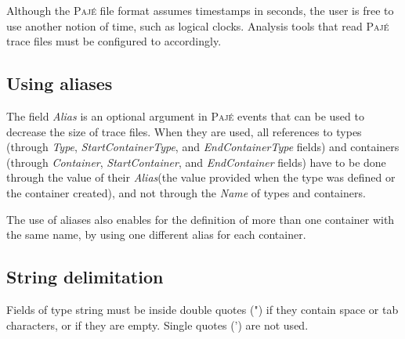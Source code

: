 \documentclass[12pt]{article}
\newcommand{\Paje}{\textsc{Paj\'e}\xspace}
\newcommand{\PajeField}[1]{\emph{#1}\xspace}
\newcommand{\Name}{\PajeField{Name}}
\newcommand{\Type}{\PajeField{Type}}
\newcommand{\Container}{\PajeField{Container}}
\newcommand{\StartContainerType}{\PajeField{StartContainerType}}
\newcommand{\EndContainerType}{\PajeField{EndContainerType}}
\newcommand{\Alias}{\PajeField{Alias}}
\newcommand{\EndContainer}{\PajeField{EndContainer}}
\newcommand{\StartContainer}{\PajeField{StartContainer}}
\begin{document}
Although the \Paje file format assumes timestamps in seconds, the user
is free to use another notion of time, such as logical
clocks. Analysis tools that read \Paje trace files must be configured
to accordingly.


\subsection{Using aliases}
\label{s.Alias}
The field \Alias is an optional argument in \Paje events that can be
used to decrease the size of trace files. When they are used, all
references to types (through \Type, \StartContainerType, and
\EndContainerType fields) and containers (through \Container,
\StartContainer, and \EndContainer fields) have to be done through the
value of their \Alias (the value provided when the type was defined or
the container created), and not through the \Name of types and
containers.

The use of aliases also enables for the definition of more than one
container with the same name, by using one different alias for each
container.

\subsection{String delimitation}
Fields of type string must be inside double quotes (") if they contain
space or tab characters, or if they are empty. Single quotes (') are
not used.


\end{document}
